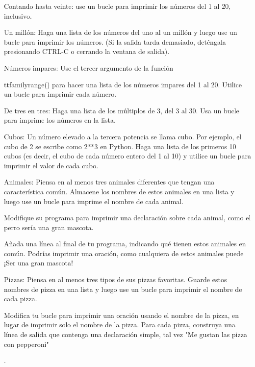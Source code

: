 \begin{enumerate}[4.2.16.1]
	
	\item  Contando hasta veinte: use un bucle {}  para imprimir los números del 1 al 20,
	inclusivo.
	
	\item [4.2.16.2]Un millón: Haga una lista de los números del uno al un millón y luego
	use un bucle {}  para imprimir los números. (Si la salida tarda demasiado, deténgala
	presionando CTRL-C o cerrando la ventana de salida).
	
	\item [4.2.16.3]Números impares: Use el tercer argumento de la función {{ttfamily{range()}} para hacer una lista
		de los números impares del 1 al 20. Utilice un bucle {}  para imprimir cada número.
		
		\item De tres en tres: Haga una lista de los múltiplos de 3, del 3 al 30. Usa un bucle {} para
		imprime los números en la lista.
		
		\item  Cubos: Un número elevado a la tercera potencia se llama cubo. Por ejemplo,
		el cubo de 2 se escribe como 2**3 en Python. Haga una lista de los primeros 10 cubos (es decir, el cubo de cada número entero del 1 al 10) y utilice un bucle {} para imprimir el valor de cada cubo.		
		
		\item  Animales: Piensa en al menos tres animales diferentes que tengan una característica común. Almacene los nombres de estos animales en una lista y luego use un bucle {} para imprime el nombre de cada animal.
		
		Modifique su programa para imprimir una declaración sobre cada animal, como el perro sería una gran mascota.
		
		Añada una línea al final de tu programa, indicando qué tienen estos animales en común. Podrías imprimir una oración, como cualquiera de estos animales puede  ¡Ser una gran mascota!
		
		\item[4.2.16.7] Pizzas: Piensa en al menos tres tipos de sus pizzas favoritas. Guarde estos
		nombres de pizza en una lista y luego use un bucle {} para imprimir el nombre de cada pizza.
		
		Modifica tu bucle {} para imprimir una oración usando el nombre de la pizza, 	en lugar de imprimir solo el nombre de la pizza. Para cada pizza, construya una línea de salida que contenga una declaración simple, tal vez {}"{}Me gustan las pizza  con  pepperoni{}"{}}.
	

\end{enumerate}
